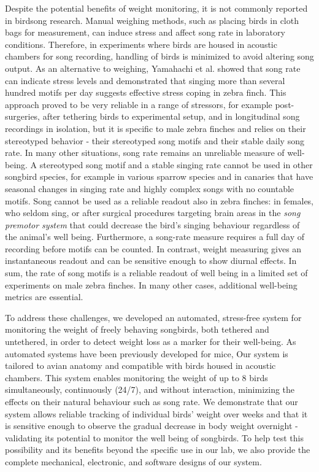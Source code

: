 \documentclass{article}
\begin{document}
Despite the potential benefits of weight monitoring, it is not commonly reported in birdsong research. Manual weighing methods, such as placing birds in cloth bags for measurement\cite{Erkenswick_2023}, can induce stress and affect song rate in laboratory conditions. Therefore, in experiments where birds are housed in acoustic chambers for song recording, handling of birds is minimized to avoid altering song output. As an alternative to weighing, Yamahachi et al. showed that song rate can indicate stress levels and demonstrated that singing more than several hundred motifs per day suggests effective stress coping in zebra finch\cite{yamahachi2020undirected}. This approach proved to be very reliable in a range of stressors, for example post-surgeries, after tethering birds to experimental setup, and in longitudinal song recordings in isolation, but it is specific to male zebra finches and relies on their stereotyped behavior - their stereotyped song motifs and their stable daily song rate. In many other  situations, song rate remains an unreliable measure of well-being. A stereotyped song motif and a stable singing rate cannot be used in other songbird species, for example in various sparrow species and in canaries that have seasonal changes in singing rate and highly complex songs with no countable motifs. Song cannot be used as a reliable readout also in zebra finches: in females, who seldom sing, or after surgical procedures targeting brain areas in the \emph{song premotor system} that could decrease the bird's singing behaviour regardless of the animal's well being\cite{schmidt2010iacuc}. Furthermore, a song-rate measure requires a full day of recording before motifs can be counted. In contrast, weight measuring gives an instantaneous readout and can be sensitive enough to show diurnal effects. In sum, the rate of song motifs is a reliable readout of well being in a limited set of experiments on male zebra finches. In many other cases, additional well-being metrics are essential.

To address these challenges, we developed an automated, stress-free system for monitoring the weight of freely behaving songbirds, both tethered and untethered, in order to detect weight loss as a marker for their well-being. As automated systems have been previously developed for mice\cite{noorshams2017automating}, Our system is tailored to avian anatomy and compatible with birds housed in acoustic chambers. This system enables monitoring the weight of up to 8 birds simultaneously, continuously (24/7), and without interaction, minimizing the effects on their natural behaviour such as song rate. We demonstrate that our system allows reliable tracking of individual birds' weight over weeks and that it is sensitive enough to observe the gradual decrease in body weight overnight - validating its potential to monitor the well being of songbirds. To help test this possibility and its benefits beyond the specific use in our lab, we also provide the complete mechanical, electronic, and software designs of our system.
\end{document}
